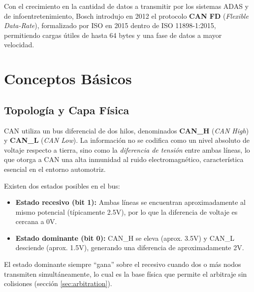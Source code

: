 \documentclass[pdflatex,sn-mathphys-num]{sn-jnl}%
\begin{document}
Con el crecimiento en la cantidad de datos a transmitir por los sistemas ADAS y de infoentretenimiento, Bosch introdujo en 2012 el protocolo \textbf{CAN FD} (\textit{Flexible Data-Rate}), formalizado por ISO en 2015 dentro de ISO 11898-1:2015, permitiendo cargas útiles de hasta 64 bytes y una fase de datos a mayor velocidad.

\section{Conceptos Básicos}\label{sec:basics}

\subsection{Topología y Capa Física}
CAN utiliza un bus diferencial de dos hilos, denominados \textbf{CAN\_H} (\textit{CAN High}) y \textbf{CAN\_L} (\textit{CAN Low}). La información no se codifica como un nivel absoluto de voltaje respecto a tierra, sino como la \textit{diferencia de tensión} entre ambas líneas, lo que otorga a CAN una alta inmunidad al ruido electromagnético, característica esencial en el entorno automotriz.

Existen dos estados posibles en el bus:
\begin{itemize}
    \item \textbf{Estado recesivo (bit 1):} Ambas líneas se encuentran aproximadamente al mismo potencial (típicamente 2.5V), por lo que la diferencia de voltaje es cercana a 0V.
    \item \textbf{Estado dominante (bit 0):} CAN\_H se eleva (aprox. 3.5V) y CAN\_L desciende (aprox. 1.5V), generando una diferencia de aproximadamente 2V.
\end{itemize}

El estado dominante siempre ``gana'' sobre el recesivo cuando dos o más nodos transmiten simultáneamente, lo cual es la base física que permite el arbitraje sin colisiones (sección \ref{sec:arbitration}).

\end{document}
